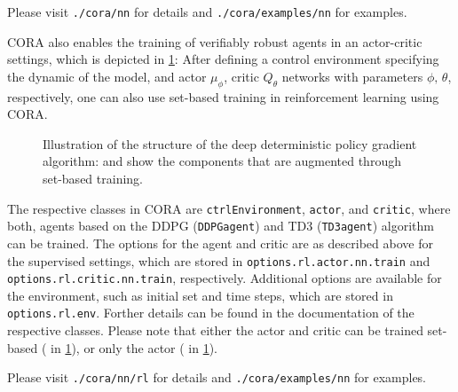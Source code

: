 \begin{center}
    \begin{minipage}[t]{0.9\textwidth}
    {\footnotesize  }
    \end{minipage}
\end{center}

Please visit \texttt{./cora/nn} for details and \texttt{./cora/examples/nn} for examples.

CORA also enables the training of verifiably robust agents in an actor-critic settings,
which is depicted in \cref{fig:rl-DDPG}:
After defining a control environment specifying the dynamic of the model,
and actor $\mu_\phi$, critic $Q_\theta$ networks with parameters $\phi,\,\theta$, respectively,
one can also use set-based training in reinforcement learning using CORA.

\begin{figure}[htb]
    \centering
    \footnotesize
    \caption{Illustration of the structure of the deep deterministic policy gradient algorithm:  and  show the components that are augmented through set-based training.}
    \label{fig:rl-DDPG}
\end{figure}

The respective classes in CORA are \texttt{ctrlEnvironment}, \texttt{actor}, and \texttt{critic},
where both, agents based on the DDPG (\texttt{DDPGagent}) and TD3 (\texttt{TD3agent}) algorithm can be trained.
The options for the agent and critic are as described above for the supervised settings,
which are stored in \texttt{options.rl.actor.nn.train} and \texttt{options.rl.critic.nn.train}, respectively.
Additional options are available for the environment, such as initial set and time steps, which are stored in \texttt{options.rl.env}.
Forther details can be found in the documentation of the respective classes.
Please note that either the actor and critic can be trained set-based ( in \cref{fig:rl-DDPG}), or only the actor ( in \cref{fig:rl-DDPG}).

Please visit \texttt{./cora/nn/rl} for details and \texttt{./cora/examples/nn} for examples.
